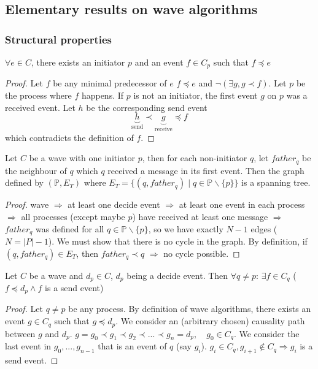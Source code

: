 \subsection{Elementary results on wave algorithms}
\subsubsection{Structural properties}
\begin{lemma}
$\forall e \in C$, there exists an initiator $p$ and an event $f\in C_p$ such that $f \preceq e$
\end{lemma}

\begin{proof}
Let $f$ be any minimal predecessor of $e$ $f \preceq e$ and $\neg (\exists g, g\prec f)$. Let $p$ be the process where $f$ happens. If $p$ is not an initiator, the first event $g$ on $p$ was a received event. Let $h$ be the corresponding send event
\[\underbrace{h}_{\text{send}} \prec \underbrace{g}_{\text{receive}}\preceq f \]
which contradicts the definition of $f$.
\end{proof}

\begin{lemma}
Let $C$ be a wave with one initiator $p$, then for each non-initiator $q$, let $father_{q}$ be the neighbour of $q$ which $q$ received a message in its first event. Then the graph defined by $(\mathbb{P}, E_T)$ where $E_T = \{(q,father_q) \;| \; q\in \mathbb{P}\smallsetminus \{ p \} \}$ is a spanning tree.
\end{lemma}

\begin{proof}
wave $\Rightarrow$ at least one decide event $\Rightarrow$ at least one event in each process $\Rightarrow$ all processes (except maybe $p$) have received at least one message $\Rightarrow$  $father_q$ was defined for all $q\in \mathbb{P} \smallsetminus \{p\}$, so we have exactly $N-1$ edges ($N=|P|-1$). We must show that there is no cycle in the graph. By definition, if $(q,father_q)\in E_T$, then $father_q \prec q$ $\Rightarrow$ no cycle possible.
\end{proof}

\begin{lemma}
Let $C$ be a wave and $d_p \in C$, $d_p$ being a decide event. Then $\forall q \neq p$: $\exists f \in C_q $ ($f\preceq d_p \land f$ is a send event)
\end{lemma}

\begin{proof}
Let $q \neq p$ be any process. By definition of wave algorithms, there exists an event $g \in C_q$ such that $g\preceq d_p$. We consider an (arbitrary chosen) causality path between $g$ and $d_p$.
$g=g_0 \prec g_1 \prec g_2 \prec ...\prec g_n = d_p, \quad g_0\in C_q$. We consider the last event in $g_0,...,g_{n-1}$ that is an event of $q$ (say $g_i$). $g_i\in C_q, g_{i+1} \notin C_q \Rightarrow g_i$ is a send event.
\end{proof}

